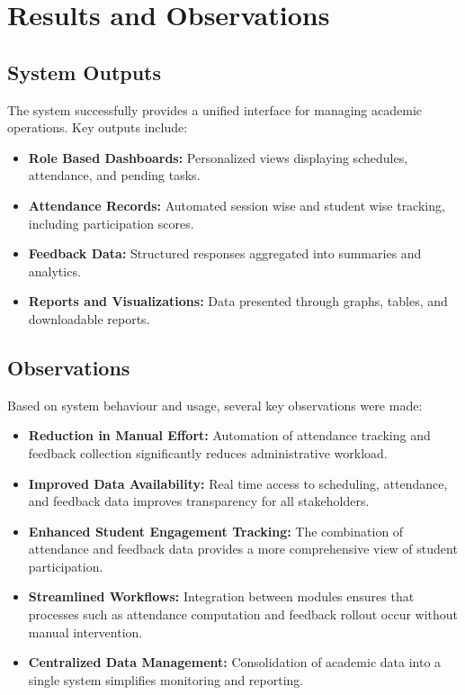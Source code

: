 
\chapter{Results and Observations}{\label{ch:results}}

\section{System Outputs}

The system successfully provides a unified interface for managing academic operations. Key outputs
include:

\begin{itemize}
    \item \textbf{Role Based Dashboards:} Personalized views displaying schedules, attendance, and pending
    tasks.
    \item \textbf{Attendance Records:} Automated session wise and student wise tracking, including
    participation scores.
    \item \textbf{Feedback Data:} Structured responses aggregated into summaries and analytics.
    \item \textbf{Reports and Visualizations:} Data presented through graphs, tables, and downloadable
    reports.
\end{itemize}

\section{Observations}

Based on system behaviour and usage, several key observations were made:

\begin{itemize}
    \item \textbf{Reduction in Manual Effort:} Automation of attendance tracking and feedback collection
    significantly reduces administrative workload.
    \item \textbf{Improved Data Availability:} Real time access to scheduling, attendance, and feedback data
    improves transparency for all stakeholders.
    \item \textbf{Enhanced Student Engagement Tracking:} The combination of attendance and feedback data
    provides a more comprehensive view of student participation.
    \item \textbf{Streamlined Workflows:} Integration between modules ensures that processes such as
    attendance computation and feedback rollout occur without manual intervention.
    \item \textbf{Centralized Data Management:} Consolidation of academic data into a single system
    simplifies monitoring and reporting.
\end{itemize}

